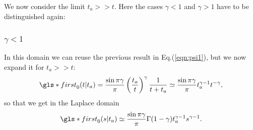 We now consider the limit $t_a>>t$. Here the cases $\gamma<1$ and $\gamma >1$ have to be distinguished again:

\subsubsection{$\gamma<1$}
In this domain we can reuse the previous result in Eq.(\ref{eqn:psi1}), but we now expand it for $t_a>>t$:
\begin{equation}
 \gls*{first}_0(t|t_a) = \frac{\sin \pi \gamma}{\pi} \left( \frac{t_a}{t}\right)^\gamma \frac{1}{t+t_a} 
  \simeq  \frac{\sin \pi \gamma}{\pi} t_a^{\gamma-1} t^{-\gamma},
\end{equation}
so that we get in the Laplace domain 
\begin{equation}
 \gls*{first}_0(s|t_a) \simeq \frac{\sin \pi \gamma}{\pi} \Gamma(1-\gamma) t_a^{\gamma-1} s^{\gamma-1}.
\end{equation}


